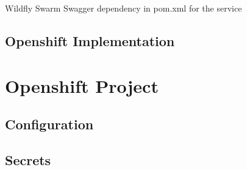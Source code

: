\begin{listing}
	\caption{Wildfly Swarm Swagger dependency in pom.xml for the service}
	\label{ls:esboi-api-client-pom}
\end{listing}

\subsection{Openshift Implementation}
\label{sec:esbi-api-openshift}

\section{Openshift Project}
\label{sec:esbi-openshift}

\subsection{Configuration}
\label{sec:esbi-openshift-config}

\subsection{Secrets}
\label{sec:esbi-openshift-secrets}

